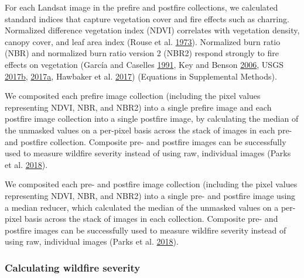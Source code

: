 \documentclass[twoside,12pt,final]{ucthesis-CA2012}
\begin{document}
\begin{ucmainmatter}
For each Landsat image in the prefire and postfire collections, we
calculated standard indices that capture vegetation cover and fire
effects such as charring. Normalized difference vegetation index (NDVI)
correlates with vegetation density, canopy cover, and leaf area index
(Rouse et al. \protect\hyperlink{ref-rouse1973}{1973}). Normalized burn
ratio (NBR) and normalized burn ratio version 2 (NBR2) respond strongly
to fire effects on vegetation (García and Caselles
\protect\hyperlink{ref-garcia1991}{1991}, Key and Benson
\protect\hyperlink{ref-key2006}{2006}, USGS
\protect\hyperlink{ref-usgs2017}{2017}\protect\hyperlink{ref-usgs2017}{b},
\protect\hyperlink{ref-usgs2017a}{2017}\protect\hyperlink{ref-usgs2017a}{a},
Hawbaker et al. \protect\hyperlink{ref-hawbaker2017}{2017}) (Equations
in Supplemental Methods).

We composited each prefire image collection (including the pixel values
representing NDVI, NBR, and NBR2) into a single prefire image and each
postfire image collection into a single postfire image, by calculating
the median of the unmasked values on a per-pixel basis across the stack
of images in each pre- and postfire collection. Composite pre- and
postfire images can be successfully used to measure wildfire severity
instead of using raw, individual images (Parks et al.
\protect\hyperlink{ref-parks2018}{2018}).

We composited each pre- and postfire image collection (including the
pixel values representing NDVI, NBR, and NBR2) into a single pre- and
postfire image using a median reducer, which calculated the median of
the unmasked values on a per-pixel basis across the stack of images in
each collection. Composite pre- and postfire images can be successfully
used to measure wildfire severity instead of using raw, individual
images (Parks et al. \protect\hyperlink{ref-parks2018}{2018}).

\subsubsection{Calculating wildfire
severity}\label{calculating-wildfire-severity}


\end{ucmainmatter}
\end{document}
